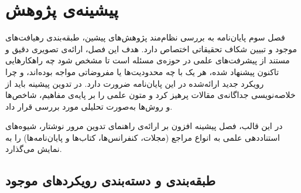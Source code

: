 

\chapter{پیشینه‌ی پژوهش}\label{chap:chapter3_literature}

فصل سوم پایان‌نامه به بررسی نظام‌مند پژوهش‌های پیشین، طبقه‌بندی رهیافت‌های موجود و تبیین شکاف تحقیقاتی اختصاص دارد. هدف این فصل، ارائه‌ی تصویری دقیق و مستند از پیشرفت‌های علمی در حوزه‌ی مسئله است تا مشخص شود چه راهکارهایی تاکنون پیشنهاد شده، هر یک با چه محدودیت‌ها یا مفروضاتی مواجه بوده‌اند، و چرا رویکرد جدید ارائه‌شده در این پایان‌نامه ضرورت دارد. در تدوین پیشینه باید از خلاصه‌نویسی جداگانه‌ی مقالات پرهیز کرد و متون علمی را بر پایه‌ی مفاهیم، شاخص‌ها و روش‌ها به‌صورت تحلیلی مورد بررسی قرار داد.

در این قالب، فصل پیشینه افزون بر ارائه‌ی راهنمای تدوین مرور نوشتار، شیوه‌های استناددهی علمی به انواع مراجع (مجلات، کنفرانس‌ها، کتاب‌ها و پایان‌نامه‌ها) را به نمایش می‌گذارد.


\section{طبقه‌بندی و دسته‌بندی رویکردهای موجود}\label{sec:3-1}

